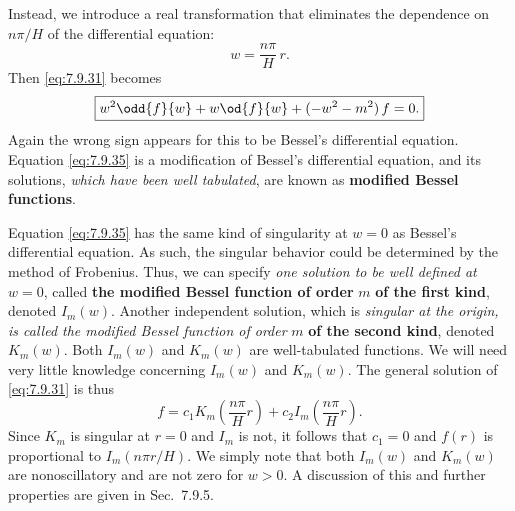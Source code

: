 Instead, we introduce a real transformation that eliminates the dependence on $n\pi/H$ of the differential equation:
\[
w = \frac{n\pi}{H}\,r.
\]
Then \eqref{eq:7.9.31} becomes
\begin{equation}
\boxed{w^2\odd{f}{w} + w\od{f}{w} + (-w^2 - m^2)\,f = 0.}
\label{eq:7.9.35}
\end{equation}
Again the wrong sign appears for this to be Bessel's differential equation.  Equation \eqref{eq:7.9.35} is a modification of Bessel's differential equation, and its solutions, \emph{which have been well tabulated}, are known as \textbf{modified Bessel functions}.

Equation \eqref{eq:7.9.35} has the same kind of singularity at $w = 0$ as Bessel's differential equation.  As such, the singular behavior could be determined by the method of Frobenius.  Thus, we can specify \emph{one solution to be well defined at} $w = 0$, called \textbf{the modified Bessel function of order} $m$ \textbf{of the first kind}, denoted $I_m(w)$.  Another independent solution, which is \emph{singular at the origin, is called the modified Bessel function of order} $m$ \textbf{of the second kind}, denoted $K_m(w)$.  Both $I_m(w)$ and $K_m(w)$ are well-tabulated functions.  We will need very little knowledge concerning $I_m(w)$ and $K_m(w)$.  The general solution of \eqref{eq:7.9.31} is thus
\begin{equation}
f = c_1 K_m\left(\frac{n\pi}{H}r\right) + c_2 I_m\left(\frac{n\pi}{H}r\right).
\label{eq:7.9.36}
\end{equation}
Since $K_m$ is singular at $r = 0$ and $I_m$ is not, it follows that $c_1 = 0$ and $f(r)$ is proportional to $I_m(n\pi r/H)$.  We simply note that both $I_m(w)$ and $K_m(w)$ are nonoscillatory and are not zero for $w > 0$.  A discussion of this and further properties are given in Sec.~7.9.5.

